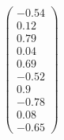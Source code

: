 \documentclass[preview]{standalone}
\begin{document}
\begin{align*}
\begin{pmatrix} -0.54 \\ 0.12 \\ 0.79 \\ 0.04 \\ 0.69 \\ -0.52 \\ 0.9 \\ -0.78 \\ 0.08 \\ -0.65 \end{pmatrix}
\end{align*}
\end{document}

